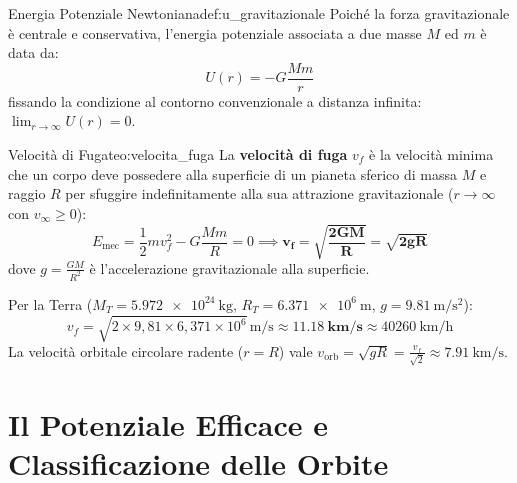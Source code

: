 \begin{definizione}{Energia Potenziale Newtoniana}{def:u_gravitazionale}
Poiché la forza gravitazionale è centrale e conservativa, l'energia potenziale associata a due masse $M$ ed $m$ è data da:
\begin{equation}
    U(r) = -G\frac{M m}{r}
    \label{eq:u_newton}
\end{equation}
fissando la condizione al contorno convenzionale a distanza infinita: $\lim_{r\to\infty} U(r) = 0$.
\end{definizione}

\begin{teorema}{Velocità di Fuga}{teo:velocita_fuga}
La \textbf{velocità di fuga} $v_f$ è la velocità minima che un corpo deve possedere alla superficie di un pianeta sferico di massa $M$ e raggio $R$ per sfuggire indefinitamente alla sua attrazione gravitazionale ($r \to \infty$ con $v_\infty \ge 0$):
\begin{equation}
    E_{\text{mec}} = \frac{1}{2}m v_f^2 - G\frac{M m}{R} = 0 \implies \mathbf{v_f = \sqrt{\frac{2 G M}{R}} = \sqrt{2 g R}}
    \label{eq:velocita_fuga}
\end{equation}
dove $g = \frac{GM}{R^2}$ è l'accelerazione gravitazionale alla superficie.
\end{teorema}

\begin{esempio}
Per la Terra ($M_T = \SI{5.972e24}{\kilogram}$, $R_T = \SI{6.371e6}{\metre}$, $g = \SI{9.81}{\metre\per\second\squared}$):
\begin{equation}
    v_f = \sqrt{2 \times 9{,}81 \times 6{,}371\times 10^6}\,\si{\metre\per\second} \approx \mathbf{\SI{11.18}{\kilo\metre\per\second}} \approx \SI{40260}{\kilo\metre\per\hour}
\end{equation}
La velocità orbitale circolare radente ($r = R$) vale $v_{\text{orb}} = \sqrt{g R} = \frac{v_f}{\sqrt{2}} \approx \SI{7.91}{\kilo\metre\per\second}$.
\end{esempio}

\section{Il Potenziale Efficace e Classificazione delle Orbite}
\label{sec:potenziale_efficace}

